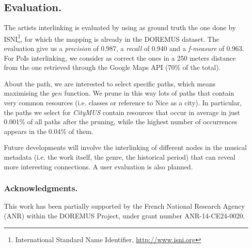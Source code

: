 \documentclass{llncs}
\begin{document}
\subsection*{Evaluation.}
The artists interlinking is evaluated by using as ground truth the one done by ISNI\footnote{International Standard Name Identifier, \url{http://www.isni.org}}, for which the mapping is already in the DOREMUS dataset. The evaluation give us a \textit{precision} of 0.987, a \textit{recall} of 0.940 and a \textit{f-measure} of 0.963. For PoIs interlinking, we consider as correct the ones in a 250 meters distance from the one retrieved through the Google Maps API (70\% of the total).

About the path, we are interested to select specific paths, which means maximising the $gen$ function. We prune in this way lots of paths that contain very common resources (i.e. classes or reference to Nice as a city). In particular, the paths we select for \textit{CityMUS} contain resources that occur in average in just 0.001\% of all paths after the pruning, while the highest number of occurrences appears in the 0.04\% of them.

Future developments will involve the interlinking of different nodes in the musical metadata (i.e. the work itself, the genre, the historical period) that can reveal more interesting connections. A user evaluation is also planned.

\subsubsection*{Acknowledgments.}
This work has been partially supported by the French National Research Agency (ANR) within the DOREMUS Project, under grant number ANR-14-CE24-0020.




\newpage
\end{document}
